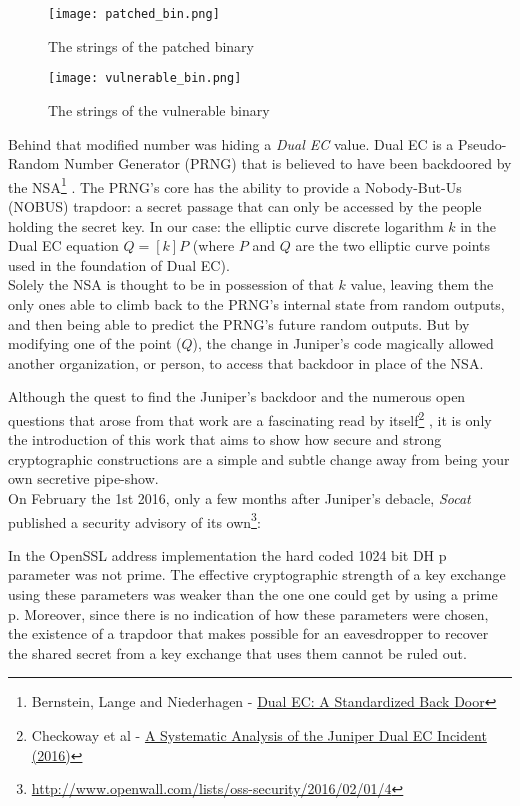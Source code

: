 \documentclass[a4paper,11pt,twocolumn]{article}
\begin{document}
\begin{figure}[H]
\centering
\texttt{[image: patched\_bin.png]}
\caption{The strings of the patched binary}\label{screenOS}
\end{figure}

\begin{figure}[H]
\centering
\texttt{[image: vulnerable\_bin.png]}
\caption{The strings of the vulnerable binary}\label{screenOS}
\end{figure}

Behind that modified number was hiding a \emph{Dual EC} value. Dual EC is a Pseudo-Random Number Generator (PRNG) that is believed to have been backdoored by the NSA\footnote{Bernstein, Lange and Niederhagen - \href{https://eprint.iacr.org/2015/767.pdf}{Dual EC: A Standardized Back Door}} \cite{dualEC}. The PRNG's core has the ability to provide a Nobody-But-Us (NOBUS) trapdoor: a secret passage that can only be accessed by the people holding the secret key. In our case: the elliptic curve discrete logarithm $k$ in the Dual EC equation $Q = [k]P$ (where $P$ and $Q$ are the two elliptic curve points used in the foundation of Dual EC).\\
Solely the NSA is thought to be in possession of that $k$ value, leaving them the only ones able to climb back to the PRNG's internal state from random outputs, and then being able to predict the PRNG's future random outputs. But by modifying one of the point ($Q$), the change in Juniper's code magically allowed another organization, or person, to access that backdoor in place of the NSA.

Although the quest to find the Juniper's backdoor and the numerous open questions that arose from that work are a fascinating read by itself\footnote{Checkoway et al - \href{http://eprint.iacr.org/2016/376}{A Systematic Analysis of the Juniper Dual EC Incident (2016)}} \cite{juniper}, it is only the introduction of this work that aims to show how secure and strong cryptographic constructions are a simple and subtle change away from being your own secretive pipe-show.\\

On February the 1st 2016, only a few months after Juniper's debacle, \emph{Socat} published a security advisory of its own\footnote{\href{http://www.openwall.com/lists/oss-security/2016/02/01/4}{http://www.openwall.com/lists/oss-security/2016/02/01/4}}:

\begin{displayquote}
In the OpenSSL address implementation the hard coded 1024 bit DH p parameter was not prime. The effective cryptographic strength of a key exchange using these parameters was weaker than the one one could get by using a prime p. Moreover, since there is no indication of how these parameters were chosen, the existence of a trapdoor that makes possible for an eavesdropper to recover the shared secret from a key exchange that uses them cannot be ruled out.
\end{displayquote}
\end{document}
